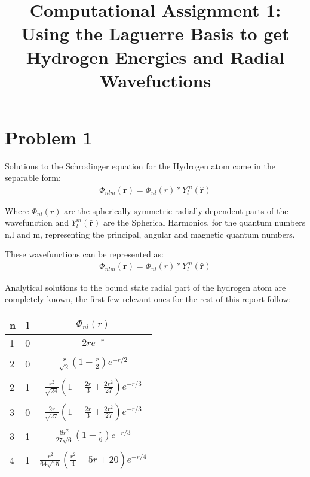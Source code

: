\documentclass{article}
\renewcommand{\vec}[1]{\mathbf{#1}}
\let\oldhat\hat
\renewcommand{\hat}[1]{\oldhat{\mathbf{#1}}}
\begin{document}
\noindent

	\title{Computational Assignment 1: Using the Laguerre Basis to get Hydrogen Energies and Radial Wavefuctions}
    \maketitle 
    
    \section{Problem 1}
    
    Solutions to the Schrodinger equation for the Hydrogen atom come in the separable form:
    \begin{gather}
    	\Phi_{nlm}(\vec{r}) =  \Phi_{nl}(r)*Y_{l}^m(\hat{\vec{r}})
    \end{gather}
    
    Where $\Phi_{nl}(r)$ are the spherically symmetric radially dependent parts of the wavefunction and $Y_{l}^m(\hat{\vec{r}})$ are the Spherical Harmonics, for the quantum numbers n,l and m, representing the principal, angular and magnetic quantum numbers. 
    
    These wavefunctions can be represented as:
    \begin{gather}
    	\Phi_{nlm}(\vec{r}) =  \Phi_{nl}(r)*Y_{l}^m(\hat{\vec{r}})
    \end{gather}
    
    Analytical solutions to the bound state radial part of the hydrogen atom are completely known, the first few relevant ones for the rest of this report follow:
    \large
    \begin{center}
    	\begin{tabular}{lcc}\toprule
    		n & l & $\Phi_{nl}(r)$ \\ \bottomrule
    		1 & 0  &   $2re^{-r}$          \\
    		&&\\
    		2 & 0  & $\frac{r}{\sqrt{2}}(1-\frac{r}{2})e^{-r/2} $  \\
    		&&\\
    		2 & 1  & $ \frac{r^2}{\sqrt{24}}(1-\frac{2r}{3} + \frac{2r^2}{27})e^{-r/3}  $  \\
    		&&\\
    		3 & 0  & $\frac{2r}{\sqrt{27}}(1-\frac{2r}{3}+\frac{2r^2}{27})e^{-r/3}$   \\
    		&&\\
    		3 & 1  & $\frac{8r^2}{27\sqrt{6}}(1-\frac{r}{6})e^{-r/3}$ \\ 
    		&&\\
    		4 & 1  & $\frac{r^2}{64\sqrt{15}}(\frac{r^2}{4}-5r+20)e^{-r/4}$ \\ \bottomrule
    	\end{tabular}
    \end{center}
    \normalsize
    
\end{document}
